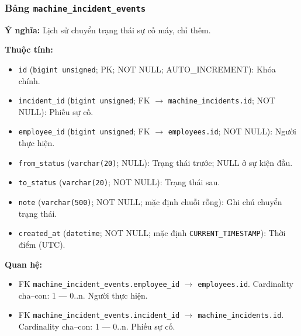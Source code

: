\subsubsection{Bảng \texttt{machine\_incident\_events}}

\textbf{Ý nghĩa:} Lịch sử chuyển trạng thái sự cố máy, chỉ thêm.\par

\textbf{Thuộc tính:}

\begin{itemize}

\item \texttt{id} (\texttt{bigint unsigned}; PK; NOT NULL; AUTO_INCREMENT): Khóa chính.

\item \texttt{incident\_id} (\texttt{bigint unsigned}; FK $\rightarrow$ \texttt{machine\_incidents.id}; NOT NULL): Phiếu sự cố.

\item \texttt{employee\_id} (\texttt{bigint unsigned}; FK $\rightarrow$ \texttt{employees.id}; NOT NULL): Người thực hiện.

\item \texttt{from\_status} (\texttt{varchar(20)}; NULL): Trạng thái trước; NULL ở sự kiện đầu.

\item \texttt{to\_status} (\texttt{varchar(20)}; NOT NULL): Trạng thái sau.

\item \texttt{note} (\texttt{varchar(500)}; NOT NULL; mặc định chuỗi rỗng): Ghi chú chuyển trạng thái.

\item \texttt{created\_at} (\texttt{datetime}; NOT NULL; mặc định \texttt{CURRENT\_TIMESTAMP}): Thời điểm (UTC).

\end{itemize}

\textbf{Quan hệ:}

\begin{itemize}

\item FK \texttt{machine\_incident\_events.employee\_id} $\rightarrow$ \texttt{employees.id}. Cardinality cha--con: 1 — 0..n. Người thực hiện.

\item FK \texttt{machine\_incident\_events.incident\_id} $\rightarrow$ \texttt{machine\_incidents.id}. Cardinality cha--con: 1 — 0..n. Phiếu sự cố.

\end{itemize}

